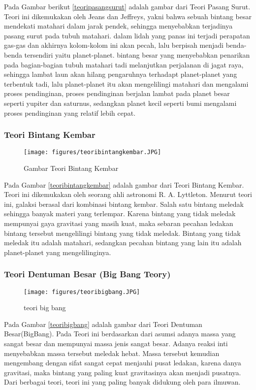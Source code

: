 Pada Gambar berikut \ref{teoripasangsurut} adalah gambar dari Teori Pasang Surut.
Teori ini dikemukakan oleh Jeans dan Jeffreys, yakni bahwa sebuah bintang besar mendekati matahari dalam jarak pendek, sehingga menyebabkan terjadinya pasang surut pada tubuh matahari. dalam lidah yang panas ini terjadi perapatan gas-gas dan akhirnya kolom-kolom ini akan pecah, lalu berpisah menjadi benda-benda tersendiri yaitu planet-planet. bintang besar yang menyebabkan penarikan pada bagian-bagian tubuh matahari tadi melanjutkan perjalanan di jagat raya, sehingga lambat laun akan hilang pengaruhnya terhadapt planet-planet yang terbentuk tadi, lalu planet-planet itu akan mengelilingi matahari dan mengalami proses pendinginan, proses pendinginan berjalan lambat pada planet besar seperti yupiter dan saturnus, sedangkan planet kecil seperti bumi mengalami proses pendinginan yang relatif lebih cepat.

\subsubsection{Teori Bintang Kembar}
\begin{figure} [ht]
	\centerline{\texttt{[image: figures/teoribintangkembar.JPG]}}
	\caption{Gambar Teori Bintang Kembar}
	\label{teori bintang kembar}
	\end{figure}


Pada Gambar \ref{teoribintangkembar} adalah gambar dari Teori Bintang Kembar.
Teori ini dikemukakan oleh seorang ahli astronomi R. A. Lyttleton. Menurut teori ini, galaksi berasal dari kombinasi bintang kembar. Salah satu bintang meledak sehingga banyak materi yang terlempar. Karena bintang yang tidak meledak mempunyai gaya gravitasi yang masih kuat, maka sebaran pecahan ledakan bintang tersebut mengelilingi bintang yang tidak meledak. Bintang yang tidak meledak itu adalah matahari, sedangkan pecahan bintang yang lain itu adalah planet-planet yang mengelilinginya.

\subsubsection{Teori Dentuman Besar (Big Bang Teory)}

\begin{figure} [ht]
	\centerline{\texttt{[image: figures/teoribigbang.JPG]}}
	\caption{teori big bang}
	\label{teori big bang}
	\end{figure}

	
Pada Gambar \ref{teoribigbang} adalah gambar dari Teori Dentuman Besar(BigBang).
Pada Teori ini berdasarkan dari asumsi adanya massa yang sangat besar dan mempunyai massa jenis sangat besar. Adanya reaksi inti menyebabkan massa tersebut meledak hebat. Massa tersebut kemudian mengembang dengan sifat sangat cepat menjauhi pusat ledakan, karena danya gravitasi, maka bintang yang paling kuat gravitasinya akan menjadi pusatnya.
Dari berbagai teori, teori ini yang paling banyak didukung oleh para ilmuwan.

